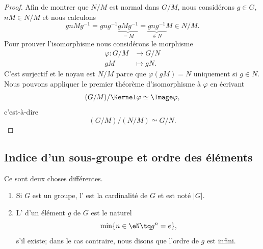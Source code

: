\begin{proof}
    Afin de montrer que \( N/M\) est normal dans \( G/M\), nous considérons \( g\in G\), \( nM\in N/M\) et nous calculons
    \begin{equation}
        gnMg^{-1}=gng^{-1}\underbrace{gMg^{-1}}_{=M}=\underbrace{gng^{-1}}_{\in N}M\in N/M.
    \end{equation}
    Pour prouver l'isomorphisme nous considérons le morphisme
    \begin{equation}
        \begin{aligned}
            \varphi\colon G/M&\to G/N \\
            gM&\mapsto gN.
        \end{aligned}
    \end{equation}
    C'est surjectif et le noyau est \( N/M\) parce que \( \varphi(gM)=N\) uniquement si \( g\in N\). Nous pouvons appliquer le premier théorème d'isomorphisme à \( \varphi\) en écrivant
    \begin{equation}
        (G/M)/\Kernel \varphi\simeq\Image \varphi,
    \end{equation}
    c'est-à-dire
    \begin{equation}
        (G/M)/(N/M)\simeq G/N.
    \end{equation}
\end{proof}

\subsection{Indice d'un sous-groupe et ordre des éléments}
\begin{definition}       \label{DEFooKWBCooMlmpCP}
    Ce sont deux choses différentes.
    \begin{enumerate}
        \item

    Si \( G\) est un groupe, l' est la cardinalité de \( G\) et est noté \( | G |\).
\item

    L' d'un élément \( g\) de \( G\) est le naturel
    \begin{equation}
        \min\{ n\in\eN\tq g^n=e \},
    \end{equation}
    s'il existe; dans le cas contraire, nous disons que l'ordre de \( g\) est infini.
    \end{enumerate}
\end{definition}

